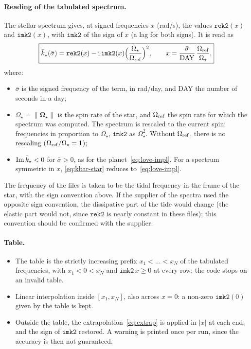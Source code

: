 \paragraph{Reading of the tabulated spectrum.} The stellar spectrum gives, at signed frequencies $x$ (rad/s), the values $\texttt{rek2}(x)$ and $\texttt{imk2}(x)$, with $\texttt{imk2}$ of the sign of $x$ (a lag for both signs). It is read as
\begin{equation}
  \boxed{\bar k_\star(\bar\sigma)=\texttt{rek2}(x)-\mathrm{i}\,\texttt{imk2}(x)\Big(\frac{\Omega_\star}{\Omega_{\rm ref}}\Big)^2,\qquad
  x=\frac{\bar\sigma}{\mathrm{DAY}}\,\frac{\Omega_{\rm ref}}{\Omega_\star},} \label{eq:kbar-star}
\end{equation}
where:
\begin{itemize}
  \item $\bar\sigma$ is the signed frequency of the term, in rad/day, and DAY the number of seconds in a day;
  \item $\Omega_\star=\|\boldsymbol\Omega_\star\|$ is the spin rate of the star, and $\Omega_{\rm ref}$ the spin rate for which the spectrum was computed. The spectrum is rescaled to the current spin: frequencies in proportion to $\Omega_\star$, $\texttt{imk2}$ as $\Omega_\star^2$. Without $\Omega_{\rm ref}$, there is no rescaling ($\Omega_{\rm ref}/\Omega_\star=1$);
  \item $\operatorname{Im}\bar k_\star<0$ for $\bar\sigma>0$, as for the planet~\eqref{eq:love-impl}. For a spectrum symmetric in $x$, \eqref{eq:kbar-star} reduces to~\eqref{eq:love-impl}.
\end{itemize}
The frequency of the files is taken to be the tidal frequency in the frame of the star, with the sign convention above. If the supplier of the spectra used the opposite sign convention, the dissipative part of the tide would change (the elastic part would not, since $\texttt{rek2}$ is nearly constant in these files); this convention should be confirmed with the supplier.

\paragraph{Table.}
\begin{itemize}
  \item The table is the strictly increasing prefix $x_1<\dots<x_N$ of the tabulated frequencies, with $x_1<0<x_N$ and $\texttt{imk2}\,x\ge0$ at every row; the code stops on an invalid table.
  \item Linear interpolation inside $[x_1,x_N]$, also across $x=0$: a non-zero $\texttt{imk2}(0)$ given by the table is kept.
  \item Outside the table, the extrapolation~\eqref{eq:extrap} is applied in $|x|$ at each end, and the sign of $\texttt{imk2}$ restored. A warning is printed once per run, since the accuracy is then not guaranteed.
\end{itemize}

